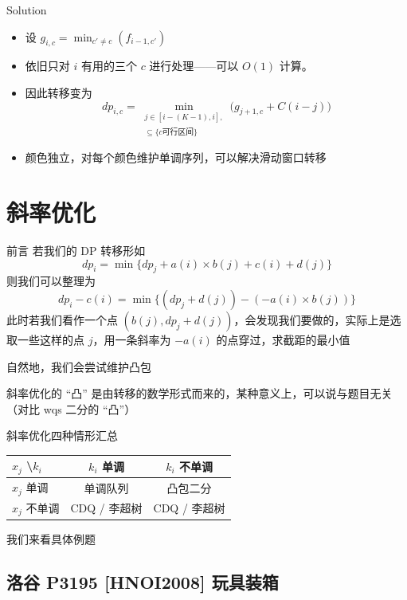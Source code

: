 ﻿\documentclass[aspectratio=169]{ctexbeamer}
\begin{document}
\begin{frame}{Solution}
    \begin{itemize}
        \item 设 $g_{i,c}=\min_{c'\neq c}\left(f_{i-1,c'}\right)$
        \item 依旧只对 $i$ 有用的三个 $c$ 进行处理——可以 $O(1)$ 计算。
        \item 因此转移变为
        $$
            dp_{i,c}=\min_{\substack{j\in [i-(K-1),i],\\ [j+1,i]\subseteq \{c\text{可行区间}\}}}
            \bigl(g_{j+1,c}+C(i-j)\bigr)
        $$
        \item 颜色独立，对每个颜色维护单调序列，可以解决滑动窗口转移
    \end{itemize}
\end{frame}






\section{斜率优化}

\begin{frame}{前言}
    若我们的 DP 转移形如
    $$
        dp_i=\min\{dp_j+a(i)\times b(j)+c(i)+d(j)\}
    $$
    则我们可以整理为
    $$
        dp_i-c(i)=\min\{(dp_j+d(j))-(-a(i)\times b(j))\}
    $$
    此时若我们看作一个点 $(b(j),dp_j+d(j))$，会发现我们要做的，实际上是选取一些这样的点 $j$，用一条斜率为 $-a(i)$ 的点穿过，求截距的最小值

    自然地，我们会尝试维护凸包

    斜率优化的 “凸” 是由转移的数学形式而来的，某种意义上，可以说与题目无关（对比 wqs 二分的 “凸”）
\end{frame}

\begin{frame}{斜率优化四种情形汇总}
    \begin{tabular}{l|cc}
    $x_j$ \textbackslash $k_i$ & $k_i$ 单调 & $k_i$ 不单调 \\
    \hline
    $x_j$ 单调 & 单调队列 & 凸包二分 \\
    $x_j$ 不单调 & CDQ / 李超树 & CDQ / 李超树
    \end{tabular}

    我们来看具体例题
\end{frame}

\subsection{洛谷 P3195 [HNOI2008] 玩具装箱}
\end{document}
